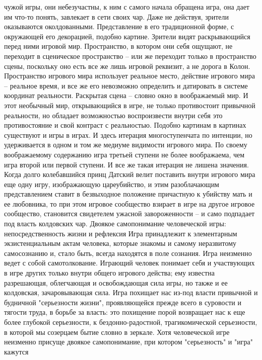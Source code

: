\documentclass[12pt]{article}
\begin{document}
чужой игры, они небезучастны, к ним с самого начала обращена игра, она дает им что-то понять, завлекает в
сети своих чар. Даже не действуя, зрители оказываются околдованными. Представление в его традиционной
форме, с окружающей его декорацией, подобно картине. Зрители видят раскрывающийся перед ними игровой
мир. Пространство, в котором они себя ощущают, не переходит в сценическое пространство -- или же переходит
только  в  пространство  сцены,  поскольку  оно  есть  все  же  лишь  игровой  реквизит,  а  не  дорога  в  Колон.
Пространство игрового мира использует реальное место, действие игрового мира -- реальное время, и все же
его невозможно определить и датировать в системе координат реальности. Раскрытая сцена -- словно окно в
воображаемый  мир.  И  этот  необычный  мир,  открывающийся  в  игре,  не  только  противостоит  привычной
реальности,  но  обладает  возможностью  воспроизвести  внутри  себя  это  противостояние  и  свой  контраст  с 
реальностью. Подобно картинам в картинах существуют и игры в играх. И здесь итерация многоступенчата по
интенции, но удерживается в одном и том же медиуме видимости игрового мира. По своему воображаемому
содержанию игра третьей ступени не более воображаема, чем игра второй или первой ступени. И все же такая
итерация не лишена значения. Когда долго колебавшийся принц Датский велит поставить внутри игрового мира
еще одну игру, изображающую цареубийство, и этим разоблачающим представлением ставит в безвыходное
положение причастную к убийству мать и ее любовника, то при этом игровое сообщество взирает в игре на
другое игровое сообщество, становится свидетелем ужасной завороженности -- и само подпадает под власть
колдовских чар.
Двоякое самопонимание человеческой игры: непосредственность жизни и рефлексия
Игра принадлежит к элементарным экзистенциальным актам человека, которые знакомы и самому неразвитому
самосознанию и, стало быть, всегда находятся в поле сознания. Игра неизменно ведет с собой самотолкование.
Играющий человек понимает себя и участвующих в игре других только внутри общего игрового действа; ему
известна разрешающая, облегчающая и освобождающая сила игры, но также и ее колдовская, зачаровывающая
сила. Игра похищает нас из-под власти привычной и будничной "серьезности жизни", проявляющейся прежде
всего в суровости и тягости труда, в борьбе за власть: это похищение порой возвращает нас к еще более
глубокой серьезности, к бездонно-радостной, трагикомической серьезности, в которой мы созерцаем бытие
словно  в  зеркале.  Хотя  человеческой  игре  неизменно  присуще  двоякое  самопонимание,  при  котором
"серьезность" и "игра" кажутся
\end{document}
